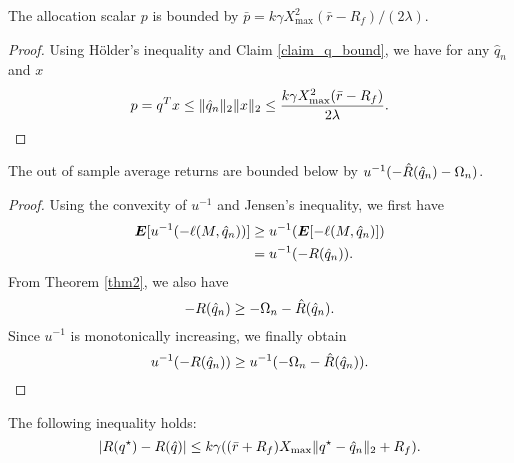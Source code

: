 \begin{claim}
  \label{claim_p_bound}
  The allocation scalar $p$ is bounded by $\bar p = k\gamma X_{\max}^2(\bar r- R_f)/(2\lambda)$.
\end{claim}
\begin{proof}
  Using Hölder's inequality and Claim \ref{claim_q_bound}, we have for any $\hat q_n$ and
  $x$
  \begin{equation*}
    p = q^Tx \leq \|\hat q_n\|_2 \|x\|_2 \leq \frac{k\gamma X_{\max}^2(\bar
      r-R_f)}{2\lambda}.\qedhere
  \end{equation*}
\end{proof}

\begin{claim}
  \label{out_of_sample_claim}
  The out of sample average returns are bounded below by $u^{-1}(-\hat R({\hat q}_n) - \Omega_n)$.
\end{claim}
\begin{proof}
  Using the convexity of $u^{-1}$ and Jensen's inequality, we first have
  \begin{align*}
    \bm E[u^{-1}(-\ell(M,{\hat q}_n))] &\geq u^{-1}(\bm E[-\ell(M,{\hat q}_n)])\\
                                &=u^{-1}(-R({\hat q}_n)).
  \end{align*}
  From Theorem \ref{thm2}, we also have 
  \begin{equation*}
    -R({\hat q}_n) \geq -\Omega_n - \hat R({\hat q}_n).
  \end{equation*}
  Since $u^{-1}$ is monotonically increasing, we finally obtain
  \begin{equation*}
    u^{-1}(-R({\hat q}_n)) \geq u^{-1}(-\Omega_n - \hat R({\hat q}_n)).\qedhere
  \end{equation*}
\end{proof}


\begin{claim}
\label{claim1}
 The following inequality holds:
\begin{equation*}
  |R({q^\star}) - R(\hat q)| \leq k\gamma((\bar r +R_f)X_{\max}\|{q^\star} - {\hat q}_n\|_2 + R_f).
\end{equation*}
\end{claim}

